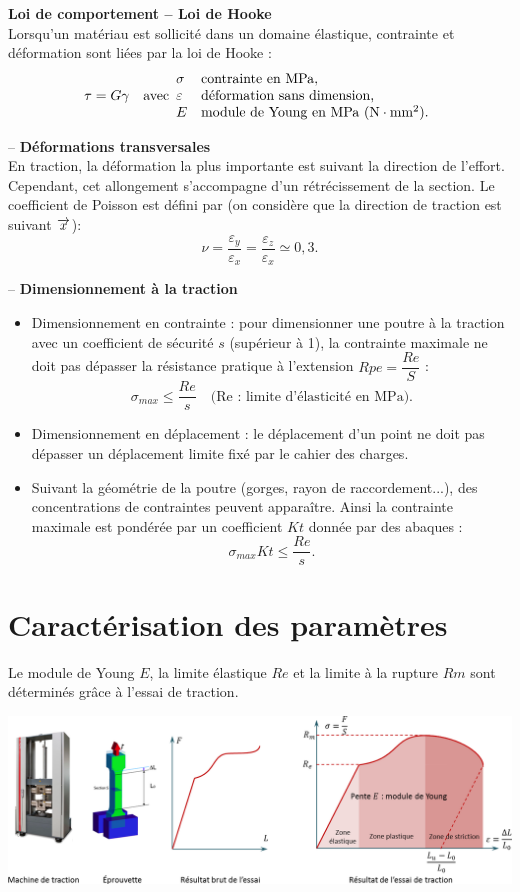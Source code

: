 \documentclass[10pt,fleqn]{article} %
\begin{document}
\begin{resultat}
\textbf{Loi de comportement -- Loi de Hooke} ~\\
Lorsqu'un matériau est sollicité dans un domaine élastique, contrainte et déformation sont liées par la loi de Hooke : 
$$ \tau = G \gamma
\quad 
\text{avec}
\begin{array}{ll}
\sigma &\text{contrainte en \text{MPa}},\\
\varepsilon &\text{déformation sans dimension,}\\
E &\text{module de Young en MPa (N}\cdot\text{mm}^2\text{).}
\end{array}
$$
\end{resultat}

\begin{resultat} -- \textbf{Déformations transversales} ~\\
En traction, la déformation la plus importante est suivant la direction de l'effort. Cependant, cet allongement s'accompagne d'un rétrécissement de la section. Le coefficient de Poisson est défini par (on considère que la direction de traction est suivant $\overrightarrow{x}$): 
$$
\nu = \dfrac{\varepsilon_y}{\varepsilon_x} = \dfrac{\varepsilon_z}{\varepsilon_x} \simeq 0,3.
$$

\end{resultat}


\begin{resultat} -- \textbf{Dimensionnement à la traction} ~\\
\begin{itemize}
\item Dimensionnement en contrainte : pour dimensionner une poutre à la traction avec un coefficient de sécurité $s$ (supérieur à 1), la contrainte maximale ne doit pas dépasser la résistance pratique à l'extension $Rpe = \dfrac{Re}{S}$ :
$$
\sigma_{max} \leq \dfrac{Re}{s} \quad \text{(Re : limite d'élasticité en MPa)}.
$$ 
\item Dimensionnement en déplacement : le déplacement d'un point ne doit pas dépasser un déplacement limite fixé par le cahier des charges.

\item Suivant la géométrie de la poutre (gorges, rayon de raccordement...), des concentrations de contraintes peuvent apparaître. Ainsi la contrainte maximale est pondérée par un coefficient $Kt$ donnée par des abaques : 
$$
\sigma_{max} Kt \leq \dfrac{Re}{s}.
$$ 
\end{itemize}
\end{resultat}


\section{Caractérisation des paramètres}
Le module de Young $E$, la limite élastique $Re$ et la limite à la rupture $Rm$ sont déterminés grâce à l'essai de traction. 
\begin{center}
\includegraphics[width=\linewidth]{images/essai_traction}
\end{center}
\end{document}
